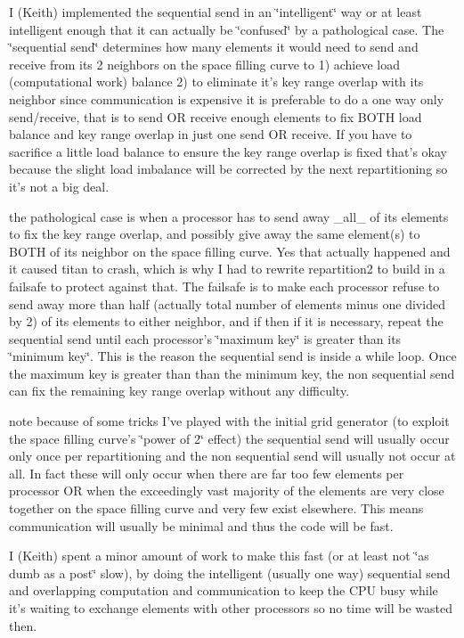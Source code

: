 I (Keith) implemented the sequential send in an \char`\"{}intelligent\char`\"{} way or at least intelligent enough that it can actually be \char`\"{}confused\char`\"{} by a pathological case. The \char`\"{}sequential send\char`\"{} determines how many elements it would need to send and receive from its 2 neighbors on the space filling curve to 1) achieve load (computational work) balance 2) to eliminate it's key range overlap with its neighbor since communication is expensive it is preferable to do a one way only send/receive, that is to send OR receive enough elements to fix BOTH load balance and key range overlap in just one send OR receive. If you have to sacrifice a little load balance to ensure the key range overlap is fixed that's okay because the slight load imbalance will be corrected by the next repartitioning so it's not a big deal.

the pathological case is when a processor has to send away \_\-all\_\- of its elements to fix the key range overlap, and possibly give away the same element(s) to BOTH of its neighbor on the space filling curve. Yes that actually happened and it caused titan to crash, which is why I had to rewrite repartition2 to build in a failsafe to protect against that. The failsafe is to make each processor refuse to send away more than half (actually total number of elements minus one divided by 2) of its elements to either neighbor, and if then if it is necessary, repeat the sequential send until each processor's \char`\"{}maximum key\char`\"{} is greater than its \char`\"{}minimum key\char`\"{}. This is the reason the sequential send is inside a while loop. Once the maximum key is greater than than the minimum key, the non sequential send can fix the remaining key range overlap without any difficulty.

note because of some tricks I've played with the initial grid generator (to exploit the space filling curve's \char`\"{}power of 2\char`\"{} effect) the sequential send will usually occur only once per repartitioning and the non sequential send will usually not occur at all. In fact these will only occur when there are far too few elements per processor OR when the exceedingly vast majority of the elements are very close together on the space filling curve and very few exist elsewhere. This means communication will usually be minimal and thus the code will be fast.

I (Keith) spent a minor amount of work to make this fast (or at least not \char`\"{}as dumb as a post\char`\"{} slow), by doing the intelligent (usually one way) sequential send and overlapping computation and communication to keep the CPU busy while it's waiting to exchange elements with other processors so no time will be wasted then.

